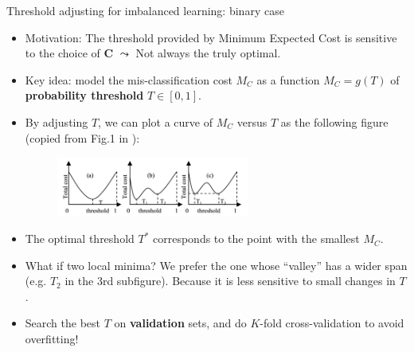 \documentclass[11pt,compress,t,notes=noshow, xcolor=table]{beamer}
\begin{document}
\begin{vbframe}{Threshold adjusting for imbalanced learning: binary case}
    \footnotesize 
    \begin{itemize}
        \footnotesize
        \item Motivation: The threshold provided by Minimum Expected Cost is sensitive to the choice of $\mathbf{C}$ $\leadsto$ Not always the truly optimal.
        \item Key idea: model the mis-classification cost $M_C$ as a function $M_C = g(T)$ of \textbf{probability threshold} $T \in [0, 1]$.
        \item By adjusting $T$, we can plot a curve of $M_C$ versus $T$ as the following figure (copied from Fig.1 in \href{https://www.aaai.org/Library/AAAI/2006/aaai06-076.php}{}):
        \begin{figure}[h]
            \centering
            \includegraphics[width=0.6\textwidth]{slides/imbalanced-learning/figure/threshold_adjusting.png}
        \end{figure}

        \item The optimal threshold $T^{*}$ corresponds to the point with the smallest $M_C$.

        \item What if two local minima? We prefer the one whose ``valley'' has a wider span (e.g. $T_2$ in the 3rd subfigure). Because it is less sensitive to small changes in $T$.

        \item Search the best $T$ on \textbf{validation} sets, and do $K$-fold cross-validation to avoid overfitting!
    \end{itemize}
\end{vbframe}
\end{document}
